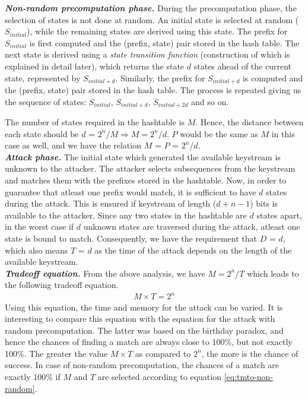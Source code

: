 \noindent \textit{\textbf{Non-random precomputation phase.}} During the precomputation phase, the selection of states is not done at random. An initial state is selected at random ($S_{initial}$), while the remaining states are derived using this state. The prefix for $S_{initial}$ is first computed and the (prefix, state) pair stored in the hash table. The next state is derived using a \emph{state transition function} (construction of which is explained in detail later), which returns the state $d$ states ahead of the current state, represented by $S_{initial+d}$. Similarly, the prefix for $S_{initial+d}$ is computed and the (prefix, state) pair stored in the hash table. The process is repeated giving us the sequence of states: $S_{initial}$, $S_{initial+d}$, $S_{initial+2d}$ and so on. 

The number of states required in the hashtable is $M$. Hence, the distance between each state should be $d$ = $2^n/M \Rightarrow M = 2^n/d$. $P$ would be the same as $M$ in this case as well, and we have the relation $M$ = $P$ = $2^n/d$.\\

\noindent \textit{\textbf{Attack phase.}} The initial state which generated the available keystream is unknown to the attacker. The attacker selects subsequences from the keystream and matches them with the prefixes stored in the hashtable. Now, in order to guarantee that atleast one prefix would match, it is sufficient to have $d$ states during the attack. This is ensured if keystream of length ($d + n - 1$) bits is available to the attacker. Since any two states in the hashtable are $d$ states apart, in the worst case if $d$ unknown states are traversed during the attack, atleast one state is bound to match. Consequently, we have the requirement that $D$ = $d$, which also means $T$ = $d$ as the time of the attack depends on the length of the available keystream.\\

\noindent \textit{\textbf{Tradeoff equation.}} From the above analysis, we have $M = 2^n/T$ which leads to the following tradeoff equation.
\begin{align}
\label{eq:tmto-non-random} M \times T = 2^n
\end{align}
Using this equation, the time and memory for the attack can be varied. It is interesting to compare this equation with the equation for the attack with random precomputation. The latter was based on the birthday paradox, and hence the chances of finding a match are always close to 100\%, but not exactly 100\%. The greater the value $M \times T$ as compared to $2^n$, the more is the chance of success. In case of non-random precomputation, the chances of a match are exactly 100\% if $M$ and $T$ are selected according to equation \ref{eq:tmto-non-random}.\\


